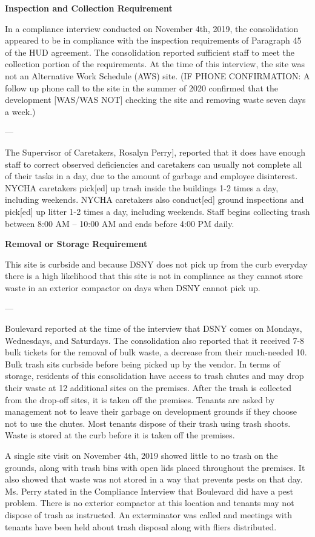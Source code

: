 

\textbf{Inspection and Collection Requirement}

In a compliance interview conducted on November 4th, 2019, the consolidation appeared to be in compliance with the inspection requirements of Paragraph 45 of the HUD agreement. The consolidation reported sufficient staff to meet the collection portion of the requirements. At the time of this interview, the site was not an Alternative Work Schedule (AWS) site. (IF PHONE CONFIRMATION: A follow up phone call to the site in the summer of 2020 confirmed that the development [WAS/WAS NOT] checking the site and removing waste seven days a week.)

---

The Supervisor of Caretakers, Rosalyn Perry], reported that it does have enough staff to correct observed deficiencies and caretakers can usually not complete all of their tasks in a day, due to the amount of garbage and employee disinterest. NYCHA caretakers pick[ed] up trash inside the buildings 1-2 times a day, including weekends. NYCHA caretakers also conduct[ed] ground inspections and pick[ed] up litter 1-2 times a day, including weekends. Staff begins collecting trash between 8:00 AM -- 10:00 AM and ends before 4:00 PM daily.

\textbf{Removal or Storage Requirement}

This site is curbside and because DSNY does not pick up from the curb everyday there is a high likelihood that this site is not in compliance as they cannot store waste in an exterior compactor on days when DSNY cannot pick up.

---

Boulevard reported at the time of the interview that DSNY comes on Mondays, Wednesdays, and Saturdays. The consolidation also reported that it received 7-8 bulk tickets for the removal of bulk waste, a decrease from their much-needed 10. Bulk trash sits curbside before being picked up by the vendor. In terms of storage, residents of this consolidation have access to trash chutes and may drop their waste at 12 additional sites on the premises. After the trash is collected from the drop-off sites, it is taken off the premises. Tenants are asked by management not to leave their garbage on development grounds if they choose not to use the chutes. Most tenants dispose of their trash using trash shoots. Waste is stored at the curb before it is taken off the premises. 

A single site visit on November 4th, 2019 showed little to no trash on the grounds, along with trash bins with open lids placed throughout the premises. It also showed that waste was not stored in a way that prevents pests on that day. Ms. Perry stated in the Compliance Interview that Boulevard did have a pest problem. There is no exterior compactor at this location and tenants may not dispose of trash as instructed. An exterminator was called and meetings with tenants have been held about trash disposal along with fliers distributed.

